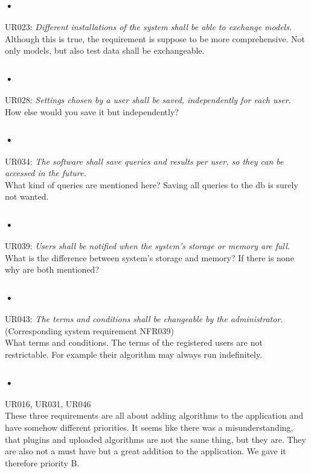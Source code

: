 \documentclass{article}
\begin{document}
\subsubsection{•}
UR023: \textit{Different installations of the system shall be able to exchange models.}\\
Although this is true, the requirement is suppose to be more comprehensive. Not only models, but also test data shall be exchangeable.

\subsubsection{•}
UR028: \textit{Settings chosen by a user shall be saved, independently for each user.}\\
How else would you save it but independently?

\subsubsection{•}
UR034: \textit{The software shall save queries and results per user, so they can be accessed in the future.}\\
What kind of queries are mentioned here? Saving all queries to the db is surely not wanted.

\subsubsection{•}
UR039: \textit{Users shall be notified when the system’s storage or memory are full.}\\
What is the difference between system’s storage and memory? If there is none why are both mentioned?

\subsubsection{•}
UR043: \textit{The terms and conditions shall be changeable by the administrator.} (Corresponding system requirement NFR039)\\
What terms and conditions. The terms of the registered users are not restrictable. For example their algorithm may always run indefinitely.

\subsubsection{•}
UR016, UR031, UR046\\
These three requirements are all about adding algorithms to the application and have somehow different priorities. It seems like there was a misunderstanding, that plugins and uploaded algorithms are not the same thing, but they are. They are also not a must have but a great addition to the application. We gave it therefore priority B.
\end{document}
